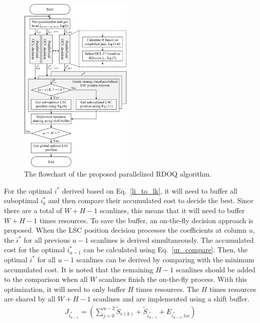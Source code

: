 \documentclass[lettersize,journal]{IEEEtran}
\begin{document}
\par
\begin{figure}[!ht]
	\centering
	\centerline{\includegraphics[width=0.48\textwidth]{figure/ProRDOQ.png}} 
	\caption{The flowchart of the proposed parallelized RDOQ algorithm.}
	\label{ProRDOQ} %
\end{figure}
For the optimal $i^{*}$ derived based on Eq.~\eqref{li_to_lk}, it will need to buffer all suboptimal $i_{k}^{*}$ and then compare their accumulated cost to decide the best. Since there are a total of $W+H-1$ scanlines, this means that it will need to buffer $W+H-1$ times resources. To save the buffer, an on-the-fly decision approach is proposed. When the LSC position decision processes the coefficients at column $u$, the $i^{*}$ for all previous $u-1$ scanlines is derived simultaneously. The accumulated cost for the optimal $i_{u-1}^{*}$ can be calculated using Eq.~\eqref{ur_compare}. Then, the optimal $i^{*}$ for all $u-1$ scanlines can be derived by comparing with the minimum accumulated cost. It is noted that the remaining $H-1$ scanlines should be added to the comparison when all $W$ scanlines finish the on-the-fly process. With this optimization, it will need to only buffer $H$ times resources. The $H$ times resources are shared by all $W+H-1$ scanlines and are implemented using a shift buffer. 
\begin{equation}
	\begin{aligned}
	\label{ur_compare}
	J_{i_{u-1 }^{*}} = \left ( \sum_{j=0}^{u-2} \widetilde{S}_{e(k)} + \widetilde{S}_{i_{u-1 }^{*}} + E_{i_{u-1 }^{*},lsc}   \right) 
\end{aligned}
\end{equation}
\end{document}
